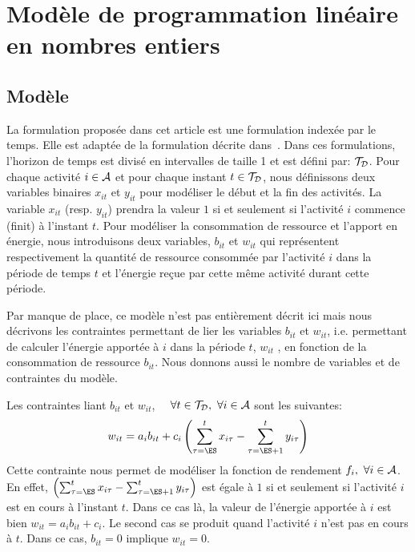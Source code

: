 \section{Modèle de programmation linéaire en nombres entiers}
\label{MIP}
\subsection{Modèle}
La formulation proposée dans cet article est une formulation indexée par
le temps. Elle est adaptée de la formulation décrite
dans~\cite{Nattaf2015}. 
Dans ces formulations, l'horizon de temps est divisé en
intervalles de taille 1 et est défini par: ${\cal T}_{\cal D}$. 
Pour chaque activité $i \in {\cal A}$ et pour chaque instant $t \in
{\cal T}_{\cal D}$, nous définissons deux variables binaires $x_{it}$
et $y_{it}$ pour modéliser le début et la fin des activités. La
variable $x_{it}$ (resp. $y_{it}$) prendra la valeur $1$ si et
seulement si l'activité $i$ commence (finit) à l'instant $t$.
Pour modéliser la consommation de ressource et l'apport en énergie,
nous introduisons deux variables, $b_{it}$ et $w_{it}$ qui
représentent respectivement la quantité de
ressource consommée par l'activité $i$ dans la période de temps
$t$ et l'énergie reçue par cette même activité durant cette période. 

Par manque de place, ce modèle n'est pas entièrement décrit ici mais
nous décrivons les contraintes permettant de lier les variables
$b_{it}$ et $w_{it}$, i.e. permettant de calculer l'énergie apportée à
$i$ dans la période $t$, $w_{it}$ , en fonction de la consommation de
ressource $b_{it}$. Nous donnons aussi le nombre de variables et de
contraintes du modèle.

Les contraintes liant $b_{it}$ et $w_{it}$, $\quad \forall t\in {\cal T}_{\cal D},\
\forall i \in {\cal A}$ sont les suivantes:
\begin{equation} \small w_{it}=a_ib_{it}+c_i\left(\sum_{\tau=\ES}^t
x_{i\tau}-\sum_{\tau=\ES+1}^t y_{i\tau}\right)  \label{conv_CECSP_TI}
\end{equation} Cette contrainte nous permet de modéliser la fonction
de rendement $f_i,\ \forall i \in {\cal A}$. En effet,
$\left(\sum_{\tau=\ES}^t x_{i\tau}-\sum_{\tau=\ES+1}^t
y_{i\tau}\right) $ est égale à $1$ si et seulement si l'activité $i$
est en cours à l'instant $t$.  Dans ce cas là, la valeur de l'énergie
apportée à $i$ est bien $w_{it}=a_ib_{it}+c_i$. Le second cas se
produit quand l'activité $i$ n'est pas en cours à $t$. Dans ce cas,
$b_{it}=0$ implique $w_{it}=0$.


